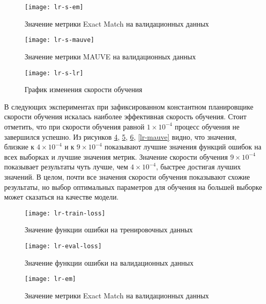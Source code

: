 \begin{figure}[!ht]
  \centering
  \texttt{[image: lr-s-em]}
  \caption{Значение метрики Exact Match на валидационных данных}
  \label{lr-s-em}
\end{figure}

\begin{figure}[!ht]
  \centering
  \texttt{[image: lr-s-mauve]}
  \caption{Значение метрики MAUVE на валидационных данных}
  \label{lr-s-mauve}
\end{figure}

\begin{figure}[!ht]
  \centering
  \texttt{[image: lr-s-lr]}
  \caption{График изменения скорости обучения}
  \label{lr-s-lr}
\end{figure}

В следующих экспериментах при зафиксированном константном планировщике скорости обучения искалась наиболее эффективная скорость обучения. Стоит отметить, что при скорости обучения равной $1 \times 10^{-4}$ процесс обучения не завершился успешно. Из рисунков \ref{lr-train-loss}, \ref{lr-eval-loss}, \ref{lr-em}, \ref{lr-mauve} видно, что значения, близкие к $4 \times 10^{-4}$ и к $9 \times 10^{-4}$ показывают лучшие значения функций ошибок на всех выборках и лучшие значения метрик. Значение скорости обучения $9 \times 10^{-4}$ показывает результаты чуть лучше, чем $4 \times 10^{-4}$, быстрее достигая лучших значений. В целом, почти все значения скорости обучения показывают схожие результаты, но выбор оптимальных параметров для обучения на большей выборке может сказаться на качестве модели.

\begin{figure}[!ht]
  \centering
  \texttt{[image: lr-train-loss]}
  \caption{Значение функции ошибки на тренировочных данных}
  \label{lr-train-loss}
\end{figure}

\begin{figure}[!ht]
  \centering
  \texttt{[image: lr-eval-loss]}
  \caption{Значение функции ошибки на валидационных данных}
  \label{lr-eval-loss}
\end{figure}

\begin{figure}[!ht]
  \centering
  \texttt{[image: lr-em]}
  \caption{Значение метрики Exact Match на валидационных данных}
  \label{lr-em}
\end{figure}

